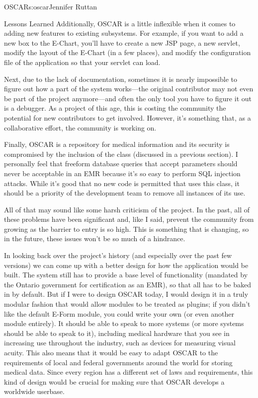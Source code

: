 \begin{aosachapter}{OSCAR}{s:oscar}{Jennifer Ruttan}
\begin{aosasect1}{Lessons Learned}
Additionally, OSCAR is a little inflexible when it comes to adding new
features to existing subsystems. For example, if you want to add a new
box to the E-Chart, you'll have to create a new JSP page, a new
servlet, modify the layout of the E-Chart (in a few places), and
modify the configuration file of the application so that your servlet
can load.

Next, due to the lack of documentation, sometimes it is nearly
impossible to figure out how a part of the system works---the original
contributor may not even be part of the project anymore---and often
the only tool you have to figure it out is a debugger. As a project of
this age, this is costing the community the potential for new
contributors to get involved. However, it's something that, as a
collaborative effort, the community is working on.

Finally, OSCAR is a repository for medical information and its
security is compromised by the inclusion of the  class
(discussed in a previous section). I personally feel that freeform
database queries that accept parameters should never be acceptable in
an EMR because it's so easy to perform SQL injection attacks. While
it's good that no new code is permitted that uses this class, it
should be a priority of the development team to remove all instances
of its use.

All of that may sound like some harsh criticism of the project. In the
past, all of these problems have been significant and, like I said,
prevent the community from growing as the barrier to entry is so
high. This is something that is changing, so in the future, these
issues won't be so much of a hindrance.

In looking back over the project's history (and especially over the
past few versions) we can come up with a better design for how the
application would be built. The system still has to provide a base
level of functionality (mandated by the Ontario government for
certification as an EMR), so that all has to be baked in by
default. But if I were to design OSCAR today, I would design it in a
truly modular fashion that would allow modules to be treated as
plugins; if you didn't like the default E-Form module, you could write
your own (or even another module entirely). It should be able to speak
to more systems (or more systems should be able to speak to it),
including medical hardware that you see in increasing use throughout
the industry, such as devices for measuring visual acuity. This also
means that it would be easy to adapt OSCAR to the requirements of
local and federal governments around the world for storing medical
data. Since every region has a different set of laws and requirements,
this kind of design would be crucial for making sure that OSCAR
develops a worldwide userbase.


\end{aosasect1}
\end{aosachapter}
